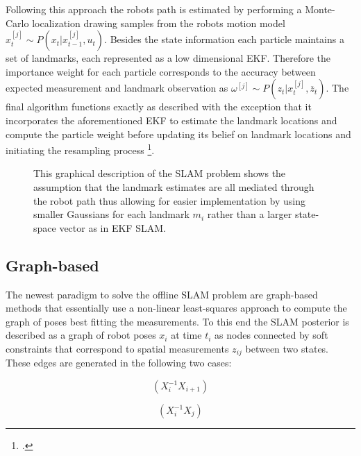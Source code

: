 Following this approach the robots path is estimated by performing a Monte-Carlo localization drawing samples from the robots motion model $x_{t}^{[j]} \sim P(x_{t} | x_{t-1}^{[j]}, u_{t}) $. Besides the state information each particle maintains a set of landmarks, each represented as a low dimensional EKF. Therefore the importance weight for each particle corresponds to the accuracy between expected measurement and landmark observation as $ \omega^{[j]} \sim P(z_{t} | x_{t}^{[j]}, \overline{z}_{t}) $.
The final algorithm functions exactly as described with the exception that it incorporates the aforementioned EKF to estimate the landmark locations and compute the particle weight before updating its belief on landmark locations and initiating the resampling process \footcite[Pages 1159-1162]{stachniss2016simultaneous}. 


\begin{figure}
	\centering
	
	\caption{
		This graphical description of the SLAM problem shows the assumption that the landmark estimates are all mediated through the robot path thus allowing for easier implementation by using smaller Gaussians for each landmark $m_{i}$ rather than a larger state-space vector as in EKF SLAM.
	}
	\label{fig:fastSlamGraphical}
\end{figure}

\subsection{Graph-based}
The newest paradigm to solve the offline SLAM problem are graph-based methods that essentially use a non-linear least-squares approach to compute the graph of poses best fitting the measurements. 
To this end the SLAM posterior is described as a graph of robot poses $ x_{i} $ at time $ t_{i} $ as nodes connected by soft constraints that correspond to spatial measurements $z_{ij}$ between two states.
These edges are generated in the following two cases:

\begin{equation}\label{odometryEdge}
	(X_{i}^{-1}X_{i+1})
\end{equation}

\begin{equation}\label{observationEdge}
	(X_{i}^{-1}X_{j})
\end{equation}

